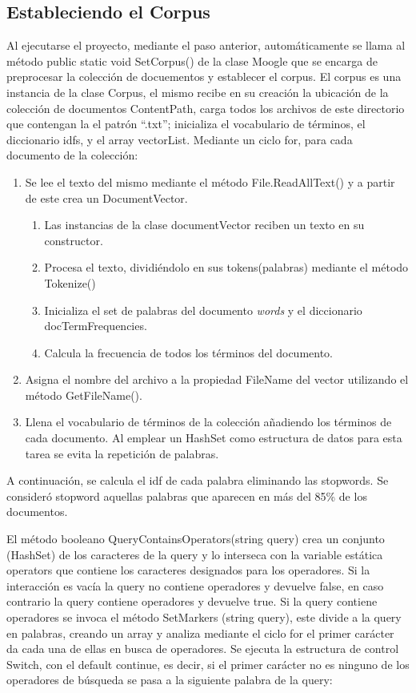 \documentclass[a4paper,12pt]{article}
\begin{document}
\subsection{Estableciendo el Corpus}
Al ejecutarse el proyecto, mediante el paso anterior, automáticamente se llama al método public
static void SetCorpus() de la clase Moogle que se encarga de preprocesar la colección de docuementos y establecer el corpus.
El corpus es una instancia de la clase Corpus, el mismo recibe en su creación la ubicación de
la colección de documentos ContentPath, carga todos los archivos de este directorio que
contengan la el patrón “.txt”; inicializa el vocabulario de términos, el diccionario idfs, y el array
vectorList.
Mediante un ciclo for, para cada documento de la colección:
\begin{enumerate}
    \item Se lee el texto del mismo mediante el método File.ReadAllText() y a partir de este crea
    un DocumentVector.
    \begin{enumerate}
        \item Las instancias de la clase documentVector reciben un texto en su constructor.
        \item Procesa el texto, dividiéndolo en sus tokens(palabras) mediante el método
        Tokenize()
        \item Inicializa el set de palabras del documento \emph{words} y el diccionario
        docTermFrequencies.
        \item Calcula la frecuencia de todos los términos del documento.
    \end{enumerate}
    \item Asigna el nombre del archivo a la propiedad FileName del vector utilizando el método
    GetFileName().
    \item Llena el vocabulario de términos de la colección añadiendo los términos de cada
    documento. Al emplear un HashSet como estructura de datos para esta tarea se evita la
    repetición de palabras.
\end{enumerate}
    A continuación, se calcula el idf de cada palabra eliminando las stopwords. Se consideró stopword aquellas
    palabras que aparecen en más del 85\% de los documentos.



El método booleano QueryContainsOperators(string query) crea un conjunto (HashSet) de los
caracteres de la query y lo interseca con la variable estática operators que contiene los
caracteres designados para los operadores. Si la interacción es vacía la query no contiene
operadores y devuelve false, en caso contrario la query contiene operadores y devuelve true.
Si la query contiene operadores se invoca el método SetMarkers (string query), este divide a la
query en palabras, creando un array y analiza mediante el ciclo for el primer carácter da cada
una de ellas en busca de operadores.
Se ejecuta la estructura de control Switch, con el default continue, es decir, si el primer carácter
no es ninguno de los operadores de búsqueda se pasa a la siguiente palabra de la query:
\end{document}

